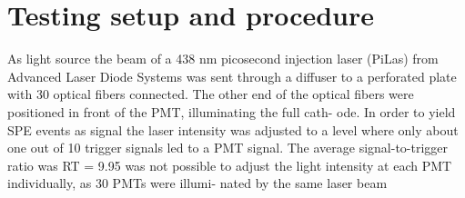 \section{Testing setup and procedure}
As light source the beam of a 438 nm picosecond injection laser (PiLas) from Advanced Laser
Diode Systems was sent through a diffuser to a perforated plate with 30 optical fibers connected.
The other end of the optical fibers were positioned in front of the PMT, illuminating the full cath-
ode. In order to yield SPE events as signal the laser intensity was adjusted to a level where only
about one out of 10 trigger signals led to a PMT signal. The average signal-to-trigger ratio was
RT = 9.95 %
was not possible to adjust the light intensity at each PMT individually, as 30 PMTs were illumi-
nated by the same laser beam